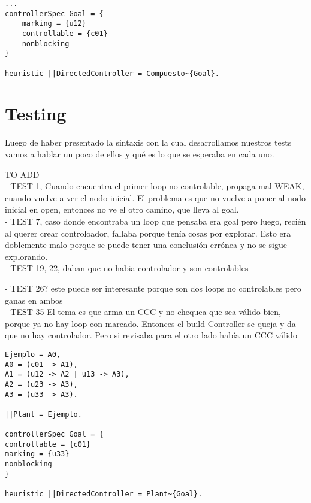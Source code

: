 \begin{lstlisting}[language = mtsa, caption=Ejemplo de Controller y DCS, label=ejController]
...
controllerSpec Goal = {
    marking = {u12}
    controllable = {c01}
    nonblocking
}

heuristic ||DirectedController = Compuesto~{Goal}.
\end{lstlisting}


\section{Testing}
Luego de haber presentado la sintaxis con la cual desarrollamos nuestros tests vamos a hablar un poco de ellos y qué es lo que se esperaba en cada uno. 


TO ADD\\

- TEST 1, Cuando encuentra el primer loop no controlable, propaga mal WEAK, cuando vuelve a ver el nodo inicial. El problema es que no vuelve a poner al nodo inicial en open, entonces no ve el otro camino, que lleva al goal.\\

- TEST 7, caso donde encontraba un loop que pensaba era goal pero luego, recién al querer crear controloador, fallaba porque tenía cosas por explorar. Esto era doblemente malo porque se puede tener una conclusión errónea y no se sigue explorando.\\

- TEST 19, 22, daban que no habia controlador y son controlables

- TEST 26? este puede ser interesante porque son dos loops no controlables pero ganas en ambos\\

- TEST 35 El tema es que arma un CCC y no chequea que sea válido bien, porque ya no hay loop con marcado. Entonces el build Controller se queja y da que no hay controlador. Pero si revisaba para el otro lado había un CCC válido

\begin{lstlisting}[language = mtsa, caption=Ejemplo de test]
Ejemplo = A0,
A0 = (c01 -> A1),
A1 = (u12 -> A2 | u13 -> A3),
A2 = (u23 -> A3),
A3 = (u33 -> A3).

||Plant = Ejemplo.

controllerSpec Goal = {
controllable = {c01}
marking = {u33}
nonblocking
}

heuristic ||DirectedController = Plant~{Goal}.
\end{lstlisting}

